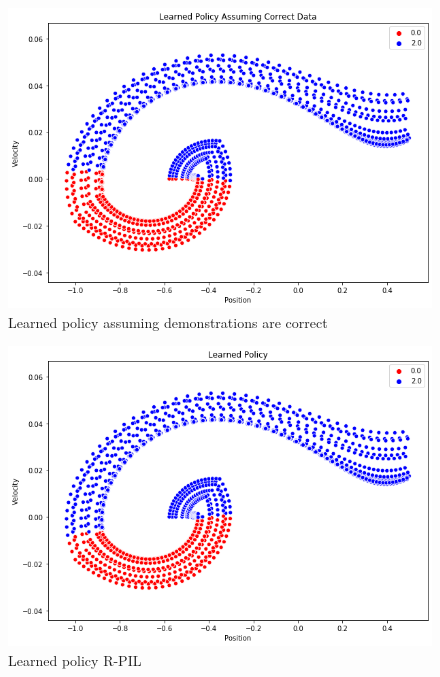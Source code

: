 \documentclass[11pt]{article}
\begin{document}
\begin{figure}[H]
    \centering
    \includegraphics[scale=0.5]{LearnedPolicyBad.png}
    \caption{Learned policy assuming demonstrations are correct}
    \label{log_reg_corrupted}
\end{figure}

\begin{figure}[H]
    \centering
    \includegraphics[scale=0.5]{LearnedPolicy.png}
    \caption{Learned policy R-PIL}
    \label{rpil_corrupted}
\end{figure}
\end{document}
